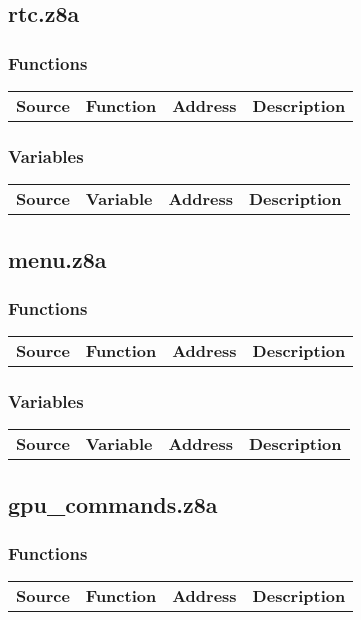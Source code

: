 \subsection{rtc.z8a}
\subsubsection{Functions}
\begin{tabular}{rllp{7cm}}
 \textbf{Source}&\textbf{Function}&\textbf{Address}&\textbf{Description}\\
\end{tabular}

\subsubsection{Variables}
\begin{tabular}{rllp{7cm}}
 \textbf{Source}&\textbf{Variable}&\textbf{Address}&\textbf{Description}\\
\end{tabular}

\subsection{menu.z8a}
\subsubsection{Functions}
\begin{tabular}{rllp{7cm}}
 \textbf{Source}&\textbf{Function}&\textbf{Address}&\textbf{Description}\\
\end{tabular}

\subsubsection{Variables}
\begin{tabular}{rllp{7cm}}
 \textbf{Source}&\textbf{Variable}&\textbf{Address}&\textbf{Description}\\
\end{tabular}

\subsection{gpu\_commands.z8a}
\subsubsection{Functions}
\begin{tabular}{rllp{7cm}}
 \textbf{Source}&\textbf{Function}&\textbf{Address}&\textbf{Description}\\
\end{tabular}

